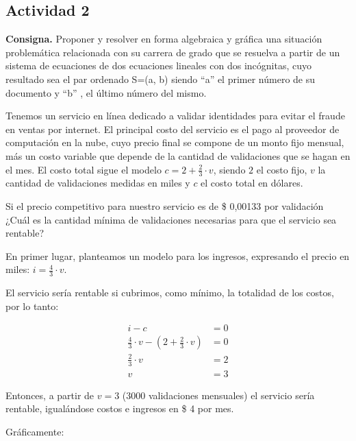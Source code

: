 \subsection*{Actividad 2}
\textbf{Consigna.}
Proponer y resolver en forma algebraica y gráfica una situación
problemática relacionada con su carrera de grado que se resuelva a
partir de un sistema de ecuaciones de dos ecuaciones lineales con
dos incógnitas, cuyo resultado sea el par ordenado S=(a, b) siendo
“a” el primer número de su documento y “b” , el último número del
mismo.

Tenemos un servicio en línea dedicado a validar identidades para evitar el fraude en ventas por internet. El principal costo del servicio es el pago al proveedor de computación en la nube, cuyo precio final se compone de un monto fijo mensual, más un costo variable que depende de la cantidad de validaciones que se hagan en el mes. El costo total sigue el modelo $c = 2 + \frac{2}{3} \cdot v$, siendo $2$ el costo fijo, $v$ la cantidad de validaciones medidas en miles y $c$ el costo total en dólares.

Si el precio competitivo para nuestro servicio es de \$ 0,00133 por validación ¿Cuál es la cantidad mínima de validaciones necesarias para que el servicio sea rentable?

En primer lugar, planteamos un modelo para los ingresos, expresando el precio en miles: $i = \frac{4}{3} \cdot v$.

El servicio sería rentable si cubrimos, como mínimo, la totalidad de los costos, por lo tanto:

\begin{align*}
    i - c                                                       & = 0 \\
    \frac{4}{3} \cdot v - \left(2 + \frac{2}{3} \cdot v \right) & = 0 \\
    \frac{2}{3} \cdot v                                         & = 2 \\
    v                                                           & = 3
\end{align*}

Entonces, a partir de $v = 3$ (3000 validaciones mensuales) el servicio sería rentable, igualándose costos e ingresos en \$ 4 por mes.

Gráficamente:

